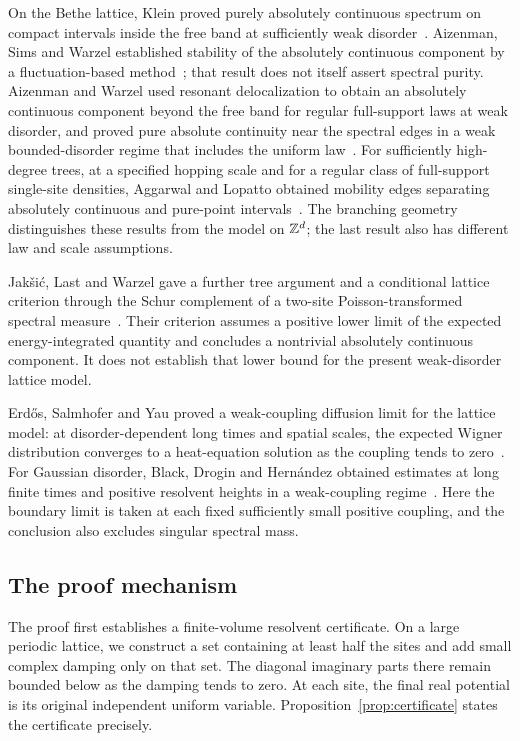 On the Bethe lattice, Klein proved purely absolutely continuous
spectrum on compact intervals inside the free band at sufficiently
weak disorder~\cite{Klein1994,Klein1998}. Aizenman, Sims and Warzel
established stability of the absolutely continuous component by a
fluctuation-based method~\cite{AizenmanSimsWarzel2006}; that result
does not itself assert spectral purity. Aizenman and Warzel used
resonant delocalization to obtain an absolutely continuous component
beyond the free band for regular full-support laws at weak disorder,
and proved pure absolute continuity near the spectral edges in a weak bounded-disorder
regime that includes the uniform law~\cite{AizenmanWarzel2013}.
For sufficiently high-degree trees, at a specified hopping scale and
for a regular class of full-support single-site densities, Aggarwal
and Lopatto obtained mobility edges separating absolutely continuous
and pure-point intervals~\cite{AggarwalLopatto2025}. The branching
geometry distinguishes these results from the model on $\mathbb Z^d$; the
last result also has different law and scale assumptions.

Jak\v{s}i\'c, Last and Warzel gave a further tree argument and a
conditional lattice criterion through the Schur complement of a
two-site Poisson-transformed spectral measure~\cite{JaksicLastWarzel2026}.
Their criterion assumes a positive lower limit of the expected
energy-integrated quantity and concludes a nontrivial absolutely
continuous component. It does not establish that lower bound for the present
weak-disorder lattice model.

Erd\H{o}s, Salmhofer and Yau proved a weak-coupling diffusion limit for
the lattice model: at disorder-dependent long times and spatial scales,
the expected Wigner distribution converges to a heat-equation solution
as the coupling tends to zero~\cite{ErdosSalmhoferYau2007}.
For Gaussian disorder, Black, Drogin and Hern\'andez obtained
estimates at long finite times and positive resolvent heights in a
weak-coupling regime~\cite{BlackDroginHernandez2025}.
Here the boundary limit is taken at each fixed sufficiently small
positive coupling, and the conclusion also excludes singular spectral
mass.

\subsection{The proof mechanism}

The proof first establishes a finite-volume resolvent certificate.
On a large periodic lattice, we construct a set containing at least
half the sites and add small complex damping only on that set. The
diagonal imaginary parts there remain bounded below as the damping
tends to zero. At each site, the final real potential is its original
independent uniform variable. Proposition~\ref{prop:certificate}
states the certificate precisely.

